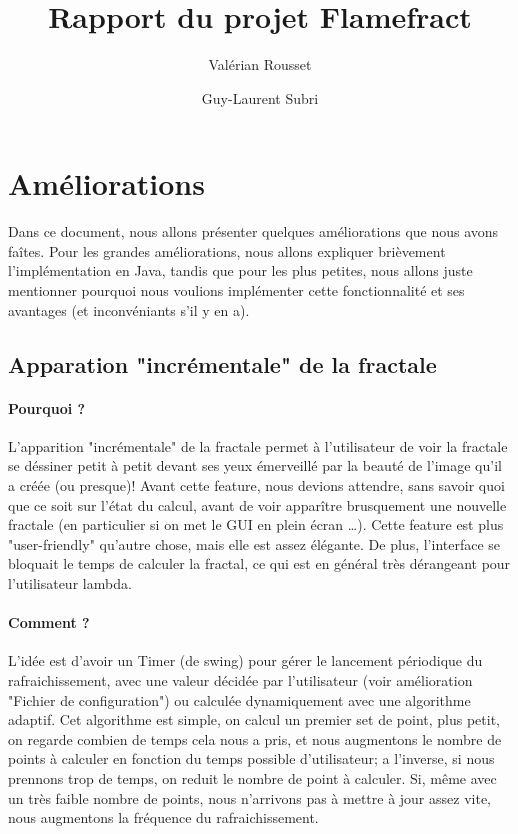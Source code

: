 \documentclass[a4paper]{article}
\author{Valérian Rousset \and Guy-Laurent Subri}
\title{Rapport du projet Flamefract}
\begin{document}
\maketitle

\section*{Améliorations}
Dans ce document, nous allons présenter quelques améliorations que nous avons faîtes. Pour les grandes améliorations, nous allons expliquer brièvement l'implémentation en Java, tandis que pour les plus petites, nous allons juste mentionner pourquoi nous voulions implémenter cette fonctionnalité et ses avantages (et inconvéniants s'il y en a).

\subsection*{Apparation "incrémentale" de la fractale}
\paragraph{Pourquoi ?}
L'apparition "incrémentale" de la fractale permet à l'utilisateur de voir la fractale se déssiner petit à petit devant ses yeux émerveillé par la beauté de l'image qu'il a créée (ou presque)! Avant cette feature, nous devions attendre, sans savoir quoi que ce soit sur l'état du calcul, avant de voir apparître brusquement une nouvelle fractale (en particulier si on met le GUI en plein écran \ldots). Cette feature est plus "user-friendly" qu'autre chose, mais elle est assez élégante. De plus, l'interface se bloquait le temps de calculer la fractal, ce qui est en général très dérangeant pour l'utilisateur lambda.

\paragraph{Comment ?}
L'idée est d'avoir un Timer (de swing) pour gérer le lancement périodique du rafraichissement, avec une valeur décidée par l'utilisateur (voir amélioration "Fichier de configuration") ou calculée dynamiquement avec une algorithme adaptif. Cet algorithme est simple, on calcul un premier set de point, plus petit, on regarde combien de temps cela nous a pris, et nous augmentons le nombre de points à calculer en fonction du temps possible d'utilisateur; a l'inverse, si nous prennons trop de temps, on reduit le nombre de point à calculer. Si, même avec un très faible nombre de points, nous n'arrivons pas à mettre à jour assez vite, nous augmentons la fréquence du rafraichissement.
\end{document}
